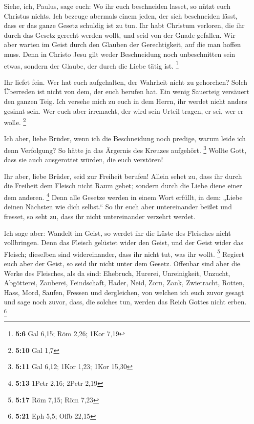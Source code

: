  Siehe, ich, Paulus, sage euch: Wo ihr euch beschneiden
lasset, so nützt euch Christus nichts.  Ich bezeuge
abermals einem jeden, der sich beschneiden lässt, dass er das ganze
Gesetz schuldig ist zu tun.  Ihr habt Christum verloren,
die ihr durch das Gesetz gerecht werden wollt, und seid von der Gnade
gefallen.  Wir aber warten im Geist durch den Glauben der
Gerechtigkeit, auf die man hoffen muss.  Denn in Christo
Jesu gilt weder Beschneidung noch unbeschnitten sein etwas, sondern der
Glaube, der durch die Liebe tätig ist. \footnote{\textbf{5:6} Gal 6,15;
  Röm 2,26; 1Kor 7,19}

 Ihr liefet fein. Wer hat euch aufgehalten, der Wahrheit
nicht zu gehorchen?  Solch Überreden ist nicht von dem,
der euch berufen hat.  Ein wenig Sauerteig versäuert den
ganzen Teig.  Ich versehe mich zu euch in dem Herrn, ihr
werdet nicht anders gesinnt sein. Wer euch aber irremacht, der wird sein
Urteil tragen, er sei, wer er wolle. \footnote{\textbf{5:10} Gal 1,7}

 Ich aber, liebe Brüder, wenn ich die Beschneidung noch
predige, warum leide ich denn Verfolgung? So hätte ja das Ärgernis des
Kreuzes aufgehört. \footnote{\textbf{5:11} Gal 6,12; 1Kor 1,23; 1Kor
  15,30}  Wollte Gott, dass sie auch ausgerottet würden,
die euch verstören!

 Ihr aber, liebe Brüder, seid zur Freiheit berufen!
Allein sehet zu, dass ihr durch die Freiheit dem Fleisch nicht Raum
gebet; sondern durch die Liebe diene einer dem anderen. \footnote{\textbf{5:13}
  1Petr 2,16; 2Petr 2,19}  Denn alle Gesetze werden in
einem Wort erfüllt, in dem: „Liebe deinen Nächsten wie dich selbst.``
 So ihr euch aber untereinander beißet und fresset, so
seht zu, dass ihr nicht untereinander verzehrt werdet.

 Ich sage aber: Wandelt im Geist, so werdet ihr die Lüste
des Fleisches nicht vollbringen.  Denn das Fleisch
gelüstet wider den Geist, und der Geist wider das Fleisch; dieselben
sind widereinander, dass ihr nicht tut, was ihr wollt. \footnote{\textbf{5:17}
  Röm 7,15; Röm 7,23}  Regiert euch aber der Geist, so
seid ihr nicht unter dem Gesetz.  Offenbar sind aber die
Werke des Fleisches, als da sind: Ehebruch, Hurerei, Unreinigkeit,
Unzucht,  Abgötterei, Zauberei, Feindschaft, Hader, Neid,
Zorn, Zank, Zwietracht, Rotten, Hass, Mord,  Saufen,
Fressen und dergleichen, von welchen ich euch zuvor gesagt und sage noch
zuvor, dass, die solches tun, werden das Reich Gottes nicht erben.
\footnote{\textbf{5:21} Eph 5,5; Offb 22,15}

